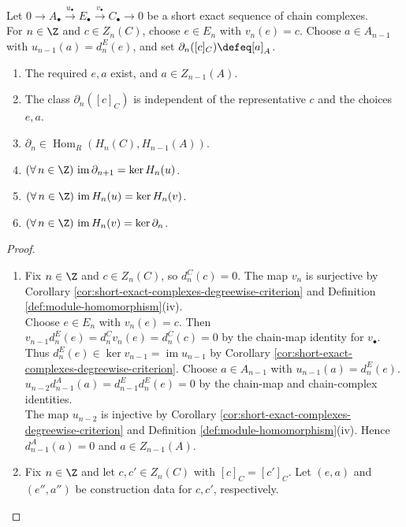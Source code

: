 \begin{theorem} \label{thm:long-exact-sequence-homology} \\
Let $0\to A_\bullet\xrightarrow{u_\bullet}E_\bullet\xrightarrow{v_\bullet}C_\bullet\to0$ be a short exact sequence of chain complexes.\\
For $n\in\Z$ and $c\in Z_n(C)$, choose $e\in E_n$ with $v_n(e)=c$. Choose $a\in A_{n-1}$ with $u_{n-1}(a)=d^E_n(e)$, and set $\partial_n([c]_C)\defeq[a]_A$.
\begin{enumerate}[label=(\roman*)]
\setlength{\itemsep}{0pt}
\item The required $e,a$ exist, and $a\in Z_{n-1}(A)$.
\item The class $\partial_n([c]_C)$ is independent of the representative $c$ and the choices $e,a$.
\item $\partial_n\in\operatorname{Hom}_R(H_n(C),H_{n-1}(A))$.
\item $(\forall\,n\in\Z)\,\operatorname{im}\partial_{n+1}=\ker H_n(u)$.
\item $(\forall\,n\in\Z)\,\operatorname{im}H_n(u)=\ker H_n(v)$.
\item $(\forall\,n\in\Z)\,\operatorname{im}H_n(v)=\ker\partial_n$.
\end{enumerate}
\begin{proof}
\begin{enumerate}[label=(\roman*)]
\setlength{\itemsep}{0pt}
\item Fix $n\in\Z$ and $c\in Z_n(C)$, so $d^C_n(c)=0$. The map $v_n$ is surjective by Corollary \ref{cor:short-exact-complexes-degreewise-criterion} and Definition \ref{def:module-homomorphism}(iv).\\
Choose $e\in E_n$ with $v_n(e)=c$. Then $v_{n-1}d^E_n(e)=d^C_nv_n(e)=d^C_n(c)=0$ by the chain-map identity for $v_\bullet$.\\
Thus $d^E_n(e)\in\ker v_{n-1}=\operatorname{im}u_{n-1}$ by Corollary \ref{cor:short-exact-complexes-degreewise-criterion}. Choose $a\in A_{n-1}$ with $u_{n-1}(a)=d^E_n(e)$.\\
$u_{n-2}d^A_{n-1}(a)=d^E_{n-1}d^E_n(e)=0$ by the chain-map and chain-complex identities.\\
The map $u_{n-2}$ is injective by Corollary \ref{cor:short-exact-complexes-degreewise-criterion} and Definition \ref{def:module-homomorphism}(iv). Hence $d^A_{n-1}(a)=0$ and $a\in Z_{n-1}(A)$.
\item Fix $n\in\Z$ and let $c,c'\in Z_n(C)$ with $[c]_C=[c']_C$. Let $(e,a)$ and $(e'',a'')$ be construction data for $c,c'$, respectively.\\

\end{enumerate}
\end{proof}
\end{theorem}
